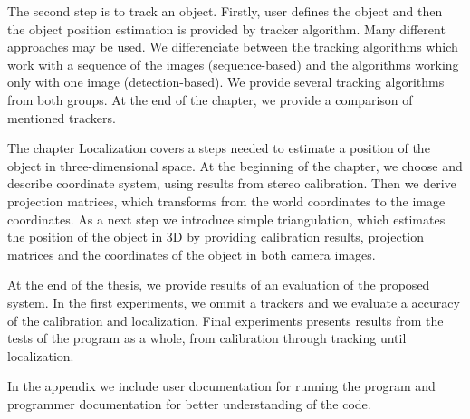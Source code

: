 The second step is to track an object. Firstly, user defines the object and
then the object position estimation is provided by tracker algorithm. Many
different approaches may be used. We differenciate between the tracking
algorithms which work with a sequence of the images (sequence-based) and the
algorithms working only with one image (detection-based). We provide several
tracking algorithms from both groups. At the end of the chapter, we provide a
comparison of mentioned trackers.

The chapter Localization covers a steps needed to estimate a position of the
object in three-dimensional space. At the beginning of the chapter, we choose
and describe coordinate system, using results from stereo calibration. Then we
derive projection matrices, which transforms from the world coordinates to the
image coordinates. As a next step we introduce simple triangulation, which
estimates the position of the object in 3D by providing calibration results,
projection matrices and the coordinates of the object in both camera images.

At the end of the thesis, we provide results of an evaluation of the proposed
system. In the first experiments, we ommit a trackers and we evaluate a
accuracy of the calibration and localization. Final experiments presents
results from the tests of the program as a whole, from calibration through
tracking until localization. 

In the appendix we include user documentation for running the program and
programmer documentation for better understanding of the code.
